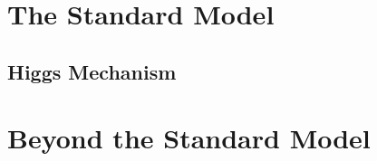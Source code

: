 \begin{comment}
\begin{figure}[!hbt]
	\centering
	\begin{subfigure}[t]{0.54\textwidth}
		\texttt{[image: \\figpath/Chapter1/Higgs\_XS\_8TeV.png]}
		\label{fig:CERN_accelerator_complex}
	\end{subfigure}
	\begin{subfigure}[t]{0.41\textwidth}
		\texttt{[image: \\figpath/Chapter1/Higgs\_BR\_4fermion.png]}
		\label{fig:LHC_LEP_injection_complex}
	\end{subfigure}
	\caption{The Standard Model Higgs production cross sections at 8\tev (left) and WW branching ratios to four fermion final states (right).}
	\label{fig:Higgs_XS_and_BR}
\end{figure}
\end{comment}

\section{The Standard Model}
\subsection{Higgs Mechanism}

\section{Beyond the Standard Model}